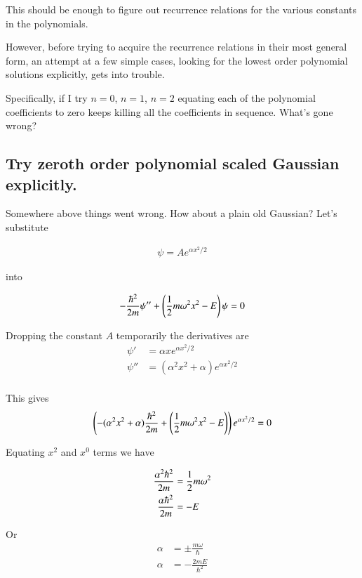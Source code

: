 \documentclass{article}
\begin{document}
This should be enough to figure out recurrence relations for the various constants in the polynomials.

However, before trying to acquire the recurrence relations in their most general form, an attempt at a few simple cases, looking for the lowest order
polynomial solutions explicitly, gets into trouble.

Specifically, if I try $n=0$, $n=1$, $n=2$ equating each of the polynomial coefficients to zero keeps killing all the coefficients in sequence.  What's 
gone wrong?

\subsection{ Try zeroth order polynomial scaled Gaussian explicitly. }

Somewhere above things went wrong.  How about a plain old Gaussian?  Let's substitute 

\begin{align*}
\psi = A e^{\alpha x^2/2}
\end{align*}

into 

\begin{align*}
-\frac{\hbar^2}{2m} \psi'' + \left( \frac{1}{2}m \omega^2 x^2 - E \right) \psi = 0
\end{align*}

Dropping the constant $A$ temporarily the derivatives are
\begin{align*}
\psi' &= \alpha x e^{\alpha x^2/2} \\
\psi'' &= ( \alpha^2 x^2 + \alpha ) e^{\alpha x^2/2} \\
\end{align*}

This gives
\begin{align*}
\left( -( \alpha^2 x^2 + \alpha )\frac{\hbar^2}{2 m} + \left( \frac{1}{2}m \omega^2 x^2 - E \right) \right) e^{\alpha x^2/2} = 0
\end{align*}

Equating $x^2$ and $x^0$ terms we have

\begin{align*}
\frac{\alpha^2 \hbar^2}{2 m} &= \frac{1}{2}m \omega^2  \\
\frac{\alpha \hbar^2}{2 m} &= -E 
\end{align*}

Or
\begin{align*}
\alpha &= \pm \frac{ m \omega }{ \hbar }  \\
{\alpha } &= - \frac{2 m E }{\hbar^2}
\end{align*}
\end{document}
